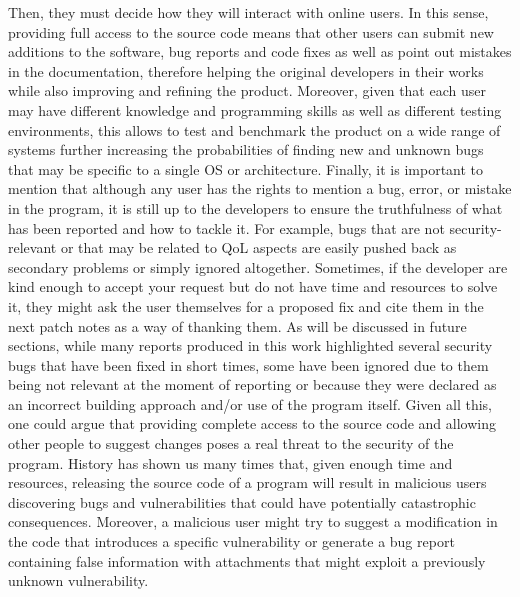 \documentclass[Lau,oneside]{sapthesis}%
\begin{document}
\newline \newline
Then, they must decide how they will interact with online users.
\newline
In this sense, providing full access to the source code means that other users can submit new additions to the software, bug reports and code fixes as well as point out mistakes in the documentation, therefore helping the original developers in their works while also improving and refining the product. Moreover, given that each user may have different knowledge and programming skills as well as different testing environments, this allows to test and benchmark the product on a wide range of systems further increasing the probabilities of finding new and unknown bugs that may be specific to a single OS or architecture.
\newline \newline
Finally, it is important to mention that although any user has the rights to mention a bug, error, or mistake in the program, it is still up to the developers to ensure the truthfulness of what has been reported and how to tackle it.
\newline
For example, bugs that are not security-relevant or that may be related to QoL aspects are easily pushed back as secondary problems or simply ignored altogether.
Sometimes, if the developer are kind enough to accept your request but do not have time and resources to solve it, they might ask the user themselves for a proposed fix and cite them in the next patch notes as a way of thanking them.
\newline \newline
As will be discussed in future sections, while many reports produced in this work highlighted several security bugs that have been fixed in short times, some have been ignored due to them being not relevant at the moment of reporting or because they were declared as an incorrect building approach and/or use of the program itself.   
\newline \newline \newline
Given all this, one could argue that providing complete access to the source code and allowing other people to suggest changes poses a real threat to the security of the program.
\newline
History has shown us many times that, given enough time and resources, releasing the source code of a program will result in malicious users discovering bugs and vulnerabilities that could have potentially catastrophic consequences. Moreover, a malicious user might try to suggest a modification in the code that introduces a specific vulnerability or generate a bug report containing false information with attachments that might exploit a previously unknown vulnerability.
\end{document}
